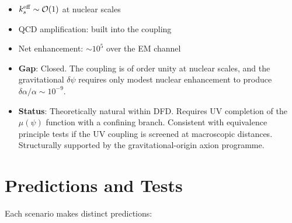 \documentclass[aps,prd,twocolumn,superscriptaddress,floatfix,nofootinbib]{revtex4-2}
\newcommand{\mufunction}{\mu}
\renewcommand{\order}[1]{\mathcal{O}\!\left(#1\right)}
\begin{document}
\begin{itemize}
\item $k_s^{\rm eff} \sim \order{1}$ at nuclear scales
\item QCD amplification: built into the coupling
\item Net enhancement: $\sim 10^5$ over the EM channel
\item \textbf{Gap}: Closed. The coupling is of order unity at nuclear scales,
and the gravitational $\delta\psi$ requires only modest nuclear enhancement
to produce $\delta\alpha/\alpha \sim 10^{-9}$.
\item \textbf{Status}: Theoretically natural within DFD. Requires UV completion
of the $\mufunction(\psi)$ function with a confining branch. Consistent with
equivalence principle tests if the UV coupling is screened at macroscopic
distances. Structurally supported by the gravitational-origin axion programme.
\end{itemize}


\section{Predictions and Tests}
\label{sec:predictions}

Each scenario makes distinct predictions:
\end{document}
